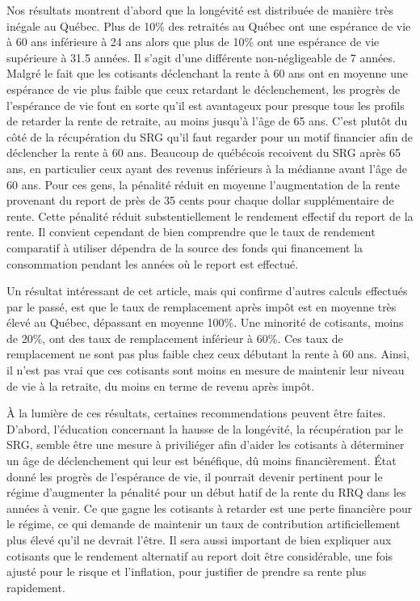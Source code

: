 \documentclass[french, 12pt]{article}
\begin{document}
	Nos résultats montrent d'abord que la longévité est distribuée de manière très inégale au Québec. Plus de 10\% des retraités au Québec ont une espérance de vie à 60 ans inférieure à 24 ans alors que plus de 10\% ont une espérance de vie supérieure à 31.5 années. Il s'agit d'une différente non-négligeable de 7 années. Malgré le fait que les cotisants déclenchant la rente à 60 ans ont en moyenne une espérance de vie plus faible que ceux retardant le déclenchement, les progrès de l'espérance de vie font en sorte qu'il est avantageux pour presque tous les profils de retarder la rente de retraite, au moins jusqu'à l'âge de 65 ans. C'est plutôt du côté de la récupération du SRG qu'il faut regarder pour un motif financier afin de déclencher la rente à 60 ans. Beaucoup de québécois recoivent du SRG après 65 ans, en particulier ceux ayant des revenus inférieurs à la médianne avant l'âge de 60 ans. Pour ces gens, la pénalité réduit en moyenne l'augmentation de la rente provenant du report de près de 35 cents pour chaque dollar supplémentaire de rente. Cette pénalité réduit substentiellement le rendement effectif du report de la rente. Il convient cependant de bien comprendre que le taux de rendement comparatif à utiliser dépendra de la source des fonds qui financement la consommation pendant les années où le report est effectué. 
	
	Un résultat intéressant de cet article, mais qui confirme d'autres calculs effectués par le passé, est que le taux de remplacement après impôt est en moyenne très élevé au Québec, dépassant en moyenne 100\%. Une minorité de cotisants, moins de 20\%, ont des taux de remplacement inférieur à 60\%. Ces taux de remplacement ne sont pas plus faible chez ceux débutant la rente à 60 ans. Ainsi, il n'est pas vrai que ces cotisants sont moins en mesure de maintenir leur niveau de vie à la retraite, du moins en terme de revenu après impôt. 
	
	À la lumière de ces résultats, certaines recommendations peuvent être faites. D'abord, l'éducation concernant la hausse de la longévité, la récupération par le SRG, semble être une mesure à priviliéger afin d'aider les cotisants à déterminer un âge de déclenchement qui leur est bénéfique, dû moins financièrement. État donné les progrès de l'espérance de vie, il pourrait devenir pertinent pour le régime d'augmenter la pénalité pour un début hatif de la rente du RRQ dans les années à venir. Ce que gagne les cotisants à retarder est une perte financière pour le régime, ce qui demande de maintenir un taux de contribution artificiellement plus élevé qu'il ne devrait l'être. Il sera aussi important de bien expliquer aux cotisants que le rendement alternatif au report doit être considérable, une fois ajusté pour le risque et l'inflation, pour justifier de prendre sa rente plus rapidement. 
	
\end{document}
